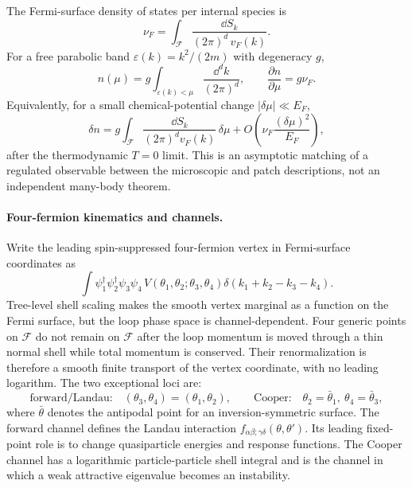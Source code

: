 The Fermi-surface density of states per internal species is
\begin{equation}
  \nu_F
  =
  \int_{\mathcal F}
  \frac{\dd S_k}{(2\pi)^d\,v_F(k)}.
  \label{eq:fermi-surface-density-of-states}
\end{equation}
For a free parabolic band \(\varepsilon(k)=k^2/(2m)\) with degeneracy \(g\),
\[
  n(\mu)
  =
  g\int_{\varepsilon(k)<\mu}\frac{\dd^dk}{(2\pi)^d},
  \qquad
  \frac{\partial n}{\partial\mu}
  =
  g\nu_F.
\]
Equivalently, for a small chemical-potential change
\(|\delta\mu|\ll E_F\),
\begin{equation}
  \delta n
  =
  g\int_{\mathcal F}
  \frac{\dd S_k}{(2\pi)^d v_F(k)}\,\delta\mu
  +
  O\!\left(\nu_F\frac{(\delta\mu)^2}{E_F}\right),
  \label{eq:fermi-density-patch-match}
\end{equation}
after the thermodynamic \(T=0\) limit.  This is an asymptotic matching of a
regulated observable between the microscopic and patch descriptions, not an
independent many-body theorem.

\paragraph{Four-fermion kinematics and channels.}
Write the leading spin-suppressed four-fermion vertex in Fermi-surface
coordinates as
\[
  \int
  \psi^\dagger_1\psi^\dagger_2\psi_3\psi_4\,
  V(\theta_1,\theta_2;\theta_3,\theta_4)
  \delta(k_1+k_2-k_3-k_4).
\]
Tree-level shell scaling makes the smooth vertex marginal as a function on the
Fermi surface, but the loop phase space is channel-dependent.  Four generic
points on \(\mathcal F\) do not remain on \(\mathcal F\) after the loop momentum
is moved through a thin normal shell while total momentum is conserved.  Their
renormalization is therefore a smooth finite transport of the vertex coordinate,
with no leading logarithm.  The two exceptional loci are:
\[
  \text{forward/Landau:}\quad
  (\theta_3,\theta_4)=(\theta_1,\theta_2),
  \qquad
  \text{Cooper:}\quad
  \theta_2=\bar\theta_1,\ \theta_4=\bar\theta_3,
\]
where \(\bar\theta\) denotes the antipodal point for an inversion-symmetric
surface.  The forward channel defines the Landau interaction
\(f_{\alpha\beta;\gamma\delta}(\theta,\theta')\).  Its leading fixed-point role
is to change quasiparticle energies and response functions.  The Cooper channel
has a logarithmic particle-particle shell integral and is the channel in which a
weak attractive eigenvalue becomes an instability.

